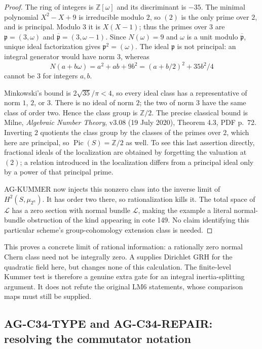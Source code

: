 \begin{proof}
The ring of integers is $\mathbb Z[\omega]$ and its discriminant is
$-35$. The minimal polynomial $X^2-X+9$ is irreducible modulo $2$,
so $(2)$ is the only prime over $2$, and is principal. Modulo $3$ it is
$X(X-1)$; thus the primes over $3$ are
$\mathfrak p=(3,\omega)$ and $\overline{\mathfrak p}=(3,\omega-1)$.
Since $N(\omega)=9$ and $\omega$ is a unit modulo
$\overline{\mathfrak p}$, unique ideal factorization gives
$\mathfrak p^2=(\omega)$. The ideal $\mathfrak p$ is not principal:
an integral generator would have norm $3$, whereas
\[
 N(a+b\omega)=a^2+ab+9b^2=(a+b/2)^2+35b^2/4
\]
cannot be $3$ for integers $a,b$.

Minkowski's bound is $2\sqrt{35}/\pi<4$, so every ideal class has a
representative of norm $1$, $2$, or $3$. There is no ideal of norm $2$;
the two of norm $3$ have the same class of order two. Hence the class
group is $\mathbb Z/2$. The precise classical bound is Milne,
\emph{Algebraic Number Theory}, v3.08 (19 July 2020), Theorem 4.3,
PDF p.~72. Inverting $2$ quotients the class group by the classes of
the primes over $2$, which here are principal, so
$\operatorname{Pic}(S)=\mathbb Z/2$ as well. To see this last assertion
directly, fractional ideals of the localization are obtained by forgetting
the valuation at $(2)$; a relation introduced in the localization differs
from a principal ideal only by a power of that principal prime.

AG-KUMMER now injects this nonzero class into the inverse limit of
$H^2(S,\mu_{2^n})$. It has order two there, so rationalization kills it.
The total space of $\mathcal L$ has a zero section with normal bundle
$\mathcal L$, making the example a literal normal-bundle obstruction of
the kind appearing in cote 149. No claim identifying this particular
scheme's group-cohomology extension class is needed.
\end{proof}

This proves a concrete limit of rational information: a rationally zero
normal Chern class need not be integrally zero. A supplies Dirichlet GRH
for the quadratic field here, but changes none of this calculation.
The finite-level Kummer test is therefore a genuine extra gate for an
integral inertia-splitting argument. It does not refute the original
LM6 statements, whose comparison maps must still be supplied.

\subsection{AG-C34-TYPE and AG-C34-REPAIR: resolving the commutator notation}
\label{ag:c34repair}

